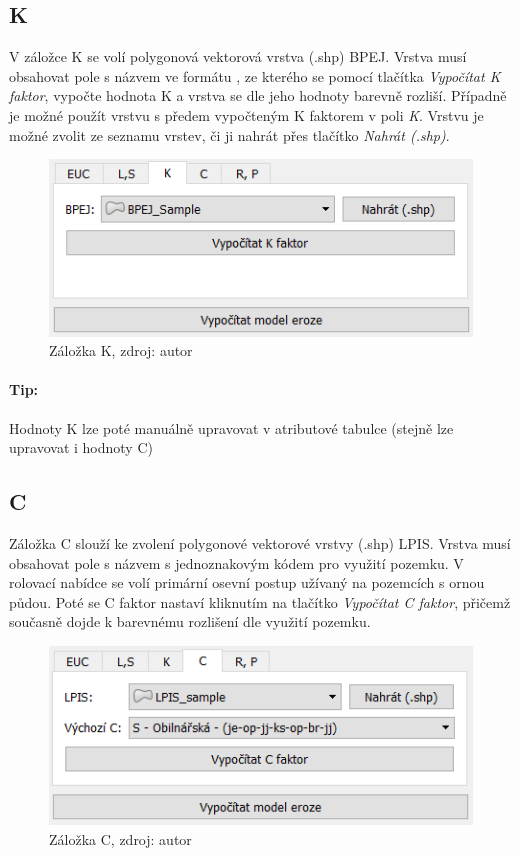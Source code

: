 \subsection{K} V záložce K se volí polygonová vektorová vrstva (.shp)
BPEJ. Vrstva musí obsahovat pole s názvem  ve formátu
, ze kterého se pomocí tlačítka \textit{Vypočítat K
faktor}, vypočte hodnota K a vrstva se dle jeho hodnoty barevně
rozliší. Případně je možné použít vrstvu s předem vypočteným K
faktorem v poli \textit{K}. Vrstvu je možné zvolit ze seznamu vrstev,
či ji nahrát přes tlačítko \textit{Nahrát (.shp)}.
\begin{figure}[H] \centering
		\includegraphics[width=.6\textwidth]{./pictures/k.png}
		\caption[Záložka K]{Záložka K, zdroj: autor}
		\label{zalozka_k}
\end{figure}
\paragraph{Tip:} Hodnoty K lze poté manuálně upravovat v atributové
tabulce (stejně lze upravovat i hodnoty C)
\subsection{C} Záložka C slouží ke zvolení polygonové vektorové vrstvy
(.shp) LPIS. Vrstva musí obsahovat pole s názvem  s
jednoznakovým kódem pro využití pozemku. V rolovací nabídce se volí
primární osevní postup užívaný na pozemcích s ornou půdou. Poté se C
faktor nastaví kliknutím na tlačítko \textit{Vypočítat C faktor},
přičemž současně dojde k barevnému rozlišení dle využití pozemku.
\begin{figure}[H] \centering
		\includegraphics[width=.6\textwidth]{./pictures/c.png}
		\caption[Záložka C]{Záložka C, zdroj: autor}
		\label{zalozka_c}
\end{figure}
